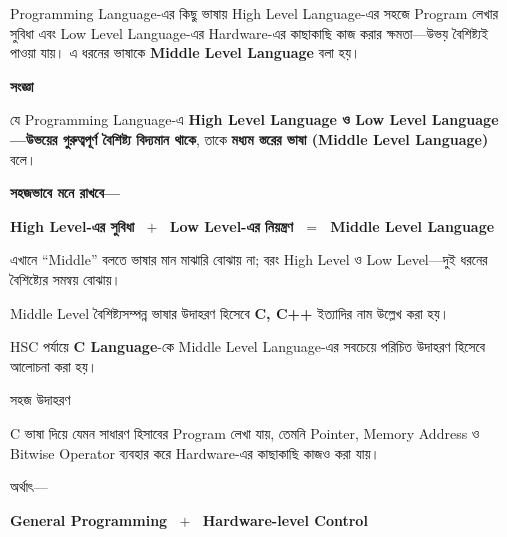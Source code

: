 
Programming Language-এর কিছু ভাষায় High Level Language-এর
সহজে Program লেখার সুবিধা এবং Low Level Language-এর
Hardware-এর কাছাকাছি কাজ করার ক্ষমতা—উভয় বৈশিষ্ট্যই পাওয়া যায়।
এ ধরনের ভাষাকে \textbf{Middle Level Language} বলা হয়।


\begin{definitionbox}

\textbf{\color{darkTeal}সংজ্ঞা}

যে Programming Language-এ \textbf{High Level Language ও Low Level
Language—উভয়ের গুরুত্বপূর্ণ বৈশিষ্ট্য বিদ্যমান থাকে}, তাকে
\textbf{মধ্যম স্তরের ভাষা (Middle Level Language)} বলে।

\end{definitionbox}

\textbf{সহজভাবে মনে রাখবে—}

\begin{center}

\textbf{
High Level-এর সুবিধা
\(\;+\;\)
Low Level-এর নিয়ন্ত্রণ
\(\;=\;\)
Middle Level Language
}

\end{center}

এখানে ``Middle'' বলতে ভাষার মান মাঝারি বোঝায় না; বরং High Level
ও Low Level—দুই ধরনের বৈশিষ্ট্যের সমন্বয় বোঝায়।


Middle Level বৈশিষ্ট্যসম্পন্ন ভাষার উদাহরণ হিসেবে
\textbf{C, C++} ইত্যাদির নাম উল্লেখ করা হয়।

HSC পর্যায়ে \textbf{C Language}-কে Middle Level Language-এর
সবচেয়ে পরিচিত উদাহরণ হিসেবে আলোচনা করা হয়।

\begin{examplebox}{সহজ উদাহরণ}

C ভাষা দিয়ে যেমন সাধারণ হিসাবের Program লেখা যায়, তেমনি
Pointer, Memory Address ও Bitwise Operator ব্যবহার করে
Hardware-এর কাছাকাছি কাজও করা যায়।

অর্থাৎ—

\begin{center}

\textbf{
General Programming
\(\;+\;\)
Hardware-level Control
}

\end{center}

\end{examplebox}

